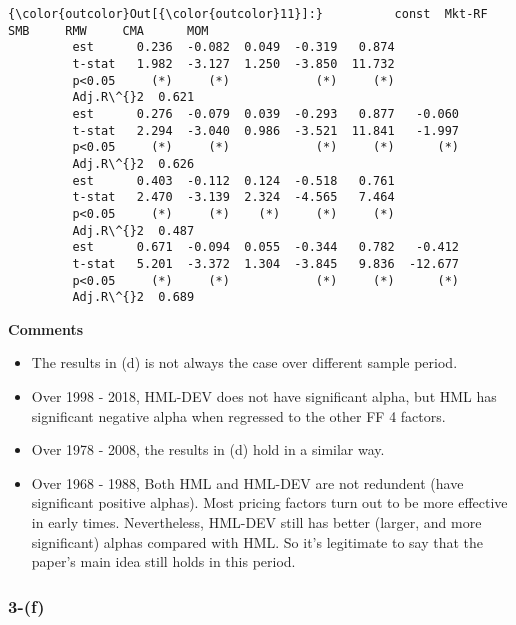 \documentclass[11pt]{article}
\providecommand{\tightlist}{%
      \setlength{\itemsep}{0pt}\setlength{\parskip}{0pt}}
\begin{document}
            \begin{Verbatim}[commandchars=\\\{\}]
{\color{outcolor}Out[{\color{outcolor}11}]:}          const  Mkt-RF    SMB     RMW     CMA      MOM
         est      0.236  -0.082  0.049  -0.319   0.874         
         t-stat   1.982  -3.127  1.250  -3.850  11.732         
         p<0.05     (*)     (*)            (*)     (*)         
         Adj.R\^{}2  0.621                                        
         est      0.276  -0.079  0.039  -0.293   0.877   -0.060
         t-stat   2.294  -3.040  0.986  -3.521  11.841   -1.997
         p<0.05     (*)     (*)            (*)     (*)      (*)
         Adj.R\^{}2  0.626                                        
         est      0.403  -0.112  0.124  -0.518   0.761         
         t-stat   2.470  -3.139  2.324  -4.565   7.464         
         p<0.05     (*)     (*)    (*)     (*)     (*)         
         Adj.R\^{}2  0.487                                        
         est      0.671  -0.094  0.055  -0.344   0.782   -0.412
         t-stat   5.201  -3.372  1.304  -3.845   9.836  -12.677
         p<0.05     (*)     (*)            (*)     (*)      (*)
         Adj.R\^{}2  0.689                                        
\end{Verbatim}
        
    \textbf{Comments}

\begin{itemize}
\tightlist
\item
  The results in (d) is not always the case over different sample
  period.
\item
  Over 1998 - 2018, HML-DEV does not have significant alpha, but HML has
  significant negative alpha when regressed to the other FF 4 factors.
\item
  Over 1978 - 2008, the results in (d) hold in a similar way.
\item
  Over 1968 - 1988, Both HML and HML-DEV are not redundent (have
  significant positive alphas). Most pricing factors turn out to be more
  effective in early times. Nevertheless, HML-DEV still has better
  (larger, and more significant) alphas compared with HML. So it's
  legitimate to say that the paper's main idea still holds in this
  period.
\end{itemize}

    \subsubsection*{3-(f)}\label{f}
\end{document}
